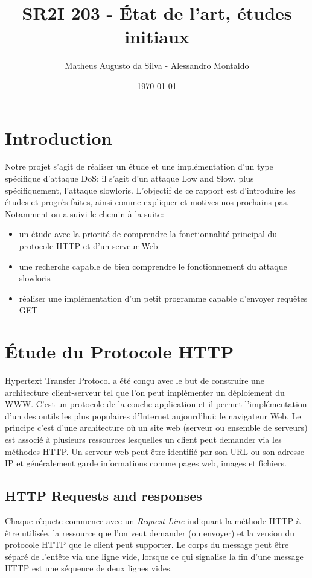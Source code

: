 \documentclass{article}
\author{Matheus Augusto da Silva - Alessandro Montaldo}
\title{\textbf{SR2I 203 - État de l'art, études initiaux}}
\date{\today}
\begin{document}
\maketitle
\section{Introduction}
Notre projet s'agit de réaliser un étude et une implémentation d'un type spécifique d'attaque DoS; il s'agit d'un attaque Low and Slow, plus spécifiquement,
l'attaque slowloris. L'objectif de ce rapport est d'introduire les études et progrès faites, ainsi comme expliquer et motives nos prochains pas.
Notamment on a suivi le chemin à la suite:

\begin{itemize}
	\item un étude avec la priorité de comprendre la fonctionnalité principal du protocole HTTP et d'un serveur Web
	\item une recherche capable de bien comprendre le fonctionnement du attaque slowloris
	\item réaliser une implémentation d'un petit programme capable d'envoyer requêtes GET
\end{itemize}

\section{Étude du Protocole HTTP}
Hypertext Transfer Protocol a été conçu avec le but de construire une architecture client-serveur tel que l'on peut implémenter un déploiement du WWW. C'est un protocole de la couche application et il permet l'implémentation d'un des outils les plus populaires d'Internet aujourd'hui: le navigateur Web.
Le principe c'est d'une architecture où un site web (serveur ou ensemble de serveurs) est associé à plusieurs ressources lesquelles un client peut demander via les méthodes HTTP. Un serveur web peut être identifié par son URL ou son adresse IP et généralement garde informations comme pages web, images et fichiers.

\subsection{HTTP Requests and responses}
Chaque rêquete commence avec un \textit{Request-Line} indiquant la méthode HTTP à être utilisée, la ressource que l'on veut demander (ou envoyer) et la version du protocole HTTP que le client peut supporter. Le corps du message peut être séparé de l'entête via une ligne vide, lorsque ce qui signalise la fin d'une message HTTP est une séquence de deux lignes vides.
\end{document}
